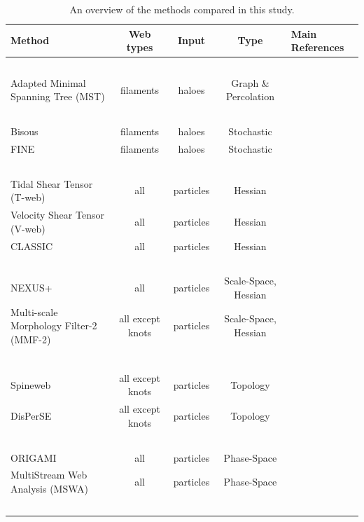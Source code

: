 \begin{table}
 \caption{An overview of the methods compared in this study.}
 \begin{tabular}{@{}lcccl}
  \hline\hline
  Method & Web types & Input & Type & Main References \\
  \hline
\ \\
  Adapted Minimal Spanning Tree (MST) & filaments & haloes & Graph \& Percolation & \citet{Alpaslan2014} \\
\ \\
  Bisous  & filaments & haloes & Stochastic & \citet{Tempel2014} \\
  FINE  & filaments & haloes & Stochastic & \citet{Gonzalez2010} \\
\ \\
  Tidal Shear Tensor (T-web) & all & particles & Hessian & \citet{Forero-Romero2009a} \\
  Velocity Shear Tensor (V-web) & all & particles & Hessian & \citet{Hoffman2012a} \\
  CLASSIC & all & particles & Hessian & \citet{2012MNRAS.425.2443K} \\
\ \\
  NEXUS+ & all & particles & Scale-Space, Hessian & \citet{Cautun2013} \\
  Multi-scale Morphology Filter-2 (MMF-2) & all except knots & particles & Scale-Space, Hessian& \citet{Aragon-Calvo2007} \\
  &&&&\citet{Aragon-Calvo2014}\\
\ \\
  Spineweb	 & all except knots & particles & Topology & \citet{Aragon-Calvo2010a} \\
  DisPerSE & all except knots & particles & Topology & \citet{Sousbie2011f} \\
\ \\
  ORIGAMI & all & particles & Phase-Space & \citet{Falck2012,Falck2015} \\
  MultiStream Web Analysis (MSWA)& all & particles & Phase-Space & \citet{Ramachandra2015} \\
\ \\
  \hline
 \end{tabular}
 \label{table:methods}
\end{table}

